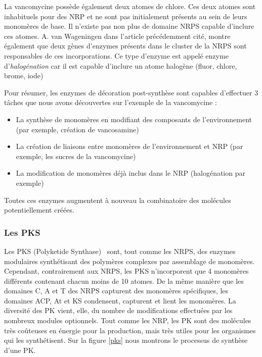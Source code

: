 La vancomycine possède également deux atomes de chlore.
Ces deux atomes sont inhabituels pour des NRP et ne sont pas initialement présents au sein de leurs monomères de base.
Il n'existe pas non plus de domaine NRPS capable d'inclure ces atomes.
A. van Wageningen dans l'article précédemment cité, montre également que deux gènes d'enzymes présents dans le cluster de la NRPS sont responsables de ces incorporations.
Ce type d'enzyme est appelé enzyme d'\textit{halogénation} car il est capable d'inclure un atome halogène (fluor, chlore, brome, iode)

Pour résumer, les enzymes de décoration post-synthèse sont capables d'effectuer 3 tâches que nous avons découvertes sur l'exemple de la vancomycine :
\begin{itemize}
  \item La synthèse de monomères en modifiant des composants de l'environnement (par exemple, création de vancosamine)
  \item La création de liaisons entre monomères de l'environnement et NRP (par exemple, les sucres de la vancomycine)
  \item La modification de monomères déjà inclus dans le NRP (halogénation par exemple)
\end{itemize}

Toutes ces enzymes augmentent à nouveau la combinatoire des molécules potentiellement créées.



\subsubsection{Les PKS}

\label{PKS_p}

Les PKS (Polyketide Synthase)~\cite{shen_polyketide_2003,staunton_polyketide_2001} sont, tout comme les NRPS, des enzymes modulaires synthétisant des polymères complexes par assemblage de monomères.
Cependant, contrairement aux NRPS, les PKS n'incorporent que 4 monomères différents contenant chacun moins de 10 atomes.
De la même manière que les domaines C, A et T des NRPS capturent des monomères spécifiques, les domaines ACP, At et KS condensent, capturent et lient les monomères.
La diversité des PK vient, elle, du nombre de modifications effectuées par les nombreux modules optionnels.
Tout comme les NRP, les PK sont des molécules très coûteuses en énergie pour la production, mais très utiles pour les organismes qui les synthétisent.
Sur la figure \ref{pks} nous montrons le processus de synthèse d'une PK.

